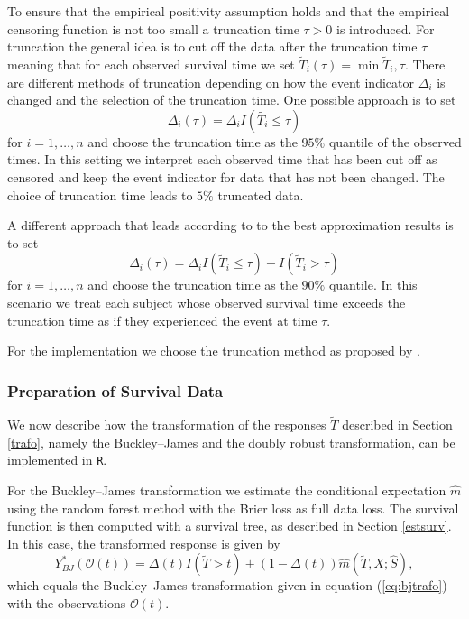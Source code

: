 \documentclass[12pt, a4paper]{scrartcl}
\theoremstyle{definition}
\theoremstyle{plain}
\numberwithin{equation}{section}
\numberwithin{figure}{section}
\numberwithin{table}{section}
\begin{document}
	To ensure that the empirical positivity assumption holds and that the empirical censoring function is not too small a truncation time $\tau>0$ is introduced.
	For truncation the general idea is to cut off the data after the truncation time $\tau$ meaning that for each observed survival time we set $\tilde{T}_i(\tau)=\min{\tilde{T}_i, \tau}$.
	There are different methods of truncation depending on how the event indicator $\Delta_i$ is changed and the selection of the truncation time.
	One possible approach is to set $$\Delta_i(\tau) = \Delta_i I(\tilde{T_i} \leq \tau)$$  for $i=1,\dots,n$ and choose the truncation time as the $95\%$ quantile of the observed times.
	In this setting we interpret each observed time that has been cut off as censored and keep the event indicator for data that has not been changed.
	The choice of truncation time leads to $5\%$ truncated data.
	
	A different approach that leads according to \citet*{drtrees} to the best approximation results is to set $$\Delta_i(\tau) = \Delta_i I(\tilde{T}_i\leq \tau) + I(\tilde{T}_i > \tau)$$ for $i=1,\dots,n$ and choose the truncation time as the $90\%$ quantile.
	In this scenario we treat each subject whose observed survival time exceeds the truncation time as if they experienced the event at time $\tau$.
	
	For the implementation we choose the truncation method as proposed by \citet*{drtrees}.
	\subsubsection{Preparation of Survival Data}
	
	We now describe how the transformation of the responses $\tilde T$ described in Section \ref{trafo}, namely the Buckley--James and the doubly robust transformation, can be implemented in \texttt{R}.
	
	For the Buckley--James transformation we estimate the conditional expectation $\hat{m}$ using the random forest method with the Brier loss as full data loss.
	The survival function is then computed with a survival tree, as described in Section \ref{estsurv}.
	In this case, the transformed response is given by
	\begin{equation*}
	Y^*_{BJ}(\mathcal{O}(t)) = \Delta(t)I(\tilde T>t)+ (1-\Delta(t))\hat{m}(\tilde T, X; \hat{S}),
	\end{equation*}
	which equals the Buckley--James transformation given in equation (\ref{eq:bjtrafo}) with the observations $\mathcal{O}(t)$.
	
\end{document}
